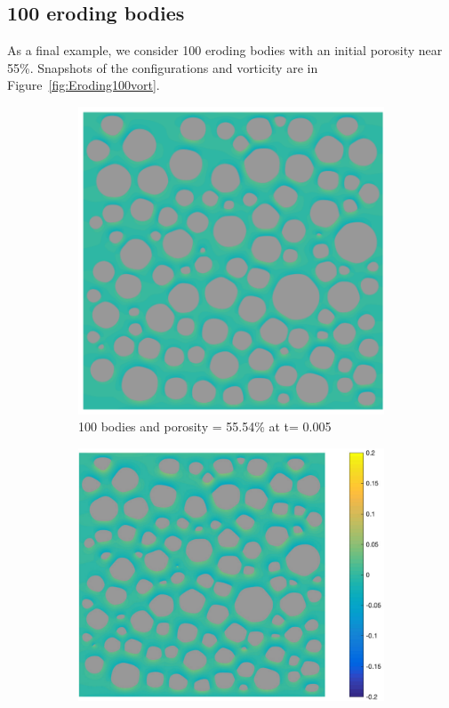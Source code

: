 \documentclass[preprint, 10pt]{elsarticle}
\begin{document}
\subsection{100 eroding bodies}
As a final example, we consider 100 eroding bodies with an initial
porosity near 55\%.  Snapshots of the configurations and vorticity are
in Figure~\ref{fig:Eroding100vort}.

\begin{figure}[H]
 \begin{subfigure}[b]{0.5\textwidth}
\includegraphics*[width =0.9\linewidth]{./figs/100b_50}
\caption{100 bodies and porosity = 55.54\% at t= 0.005}
\end{subfigure}%
\begin{subfigure}[b]{0.5\textwidth}
\includegraphics*[width =1.1\linewidth]{./figs/100b_100}

\end{subfigure}
\end{figure}
\end{document}

